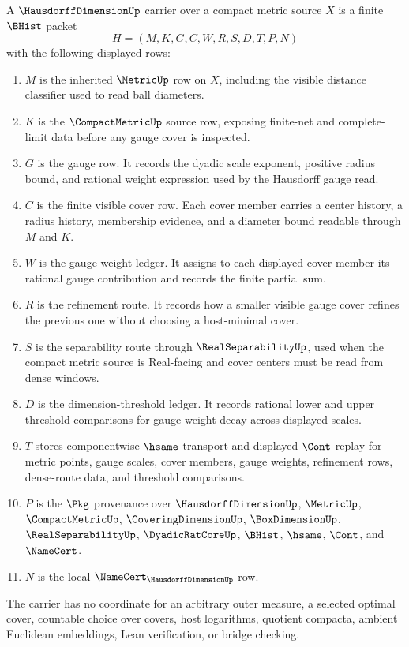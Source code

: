 \begin{definition}
\label{def:hausdorff-dimension-carrier}
A $\HausdorffDimensionUp$ carrier over a compact metric source $X$ is a finite $\BHist$ packet
$$
H=(M,K,G,C,W,R,S,D,T,P,N)
$$
with the following displayed rows:
\begin{enumerate}
\item $M$ is the inherited $\MetricUp$ row on $X$, including the visible distance classifier used to read ball diameters.
\item $K$ is the $\CompactMetricUp$ source row, exposing finite-net and complete-limit data before any gauge cover is inspected.
\item $G$ is the gauge row. It records the dyadic scale exponent, positive radius bound, and rational weight expression used by the Hausdorff gauge read.
\item $C$ is the finite visible cover row. Each cover member carries a center history, a radius history, membership evidence, and a diameter bound readable through $M$ and $K$.
\item $W$ is the gauge-weight ledger. It assigns to each displayed cover member its rational gauge contribution and records the finite partial sum.
\item $R$ is the refinement route. It records how a smaller visible gauge cover refines the previous one without choosing a host-minimal cover.
\item $S$ is the separability route through $\RealSeparabilityUp$, used when the compact metric source is Real-facing and cover centers must be read from dense windows.
\item $D$ is the dimension-threshold ledger. It records rational lower and upper threshold comparisons for gauge-weight decay across displayed scales.
\item $T$ stores componentwise $\hsame$ transport and displayed $\Cont$ replay for metric points, gauge scales, cover members, gauge weights, refinement rows, dense-route data, and threshold comparisons.
\item $P$ is the $\Pkg$ provenance over $\HausdorffDimensionUp$, $\MetricUp$, $\CompactMetricUp$, $\CoveringDimensionUp$, $\BoxDimensionUp$, $\RealSeparabilityUp$, $\DyadicRatCoreUp$, $\BHist$, $\hsame$, $\Cont$, and $\NameCert$.
\item $N$ is the local $\NameCert_{\HausdorffDimensionUp}$ row.
\end{enumerate}
The carrier has no coordinate for an arbitrary outer measure, a selected optimal cover, countable choice over covers, host logarithms, quotient compacta, ambient Euclidean embeddings, Lean verification, or bridge checking.
\end{definition}

